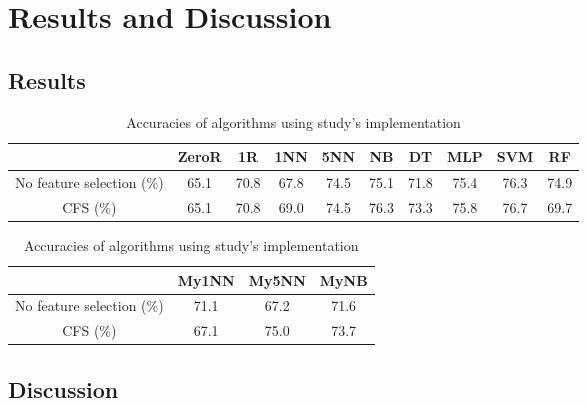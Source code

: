 \documentclass{article}
\begin{document}
    \section{Results and Discussion}
    \subsection{Results}
    \begin{table}[h!]
        \begin{center}
          \caption{Accuracies of algorithms using Weka}
          \label{tab:table1}
          \begin{tabular}{| c | c | c | c | c | c | c | c | c | c |} %
            \toprule
            & \textbf{ZeroR} & \textbf{1R} & \textbf{1NN} & \textbf{5NN} & \textbf{NB} & \textbf{DT} & \textbf{MLP} & \textbf{SVM} & \textbf{RF}\\
            \midrule
            
            No feature selection (\%) & 65.1 & 70.8 & 67.8 & 74.5 & 75.1 & 71.8 & 75.4 & 76.3 & 74.9 \\
            \midrule
            CFS (\%) & 65.1 & 70.8 & 69.0 & 74.5 & 76.3 & 73.3 & 75.8 & 76.7 & 69.7 \\
            \bottomrule
        \end{tabular}
        \caption{Accuracies of algorithms using study's implementation}
          \label{tab:table2}
          \begin{tabular}{| c | c | c | c |} %
            \toprule
            & \textbf{My1NN} & \textbf{My5NN} & \textbf{MyNB} \\
            \midrule
            
            No feature selection (\%) & 71.1 & 67.2 & 71.6 \\
            \midrule
            CFS (\%) & 67.1 & 75.0 & 73.7 \\
            \bottomrule
        \end{tabular}

        \end{center}
      \end{table}

    \subsection{Discussion}
\end{document}
